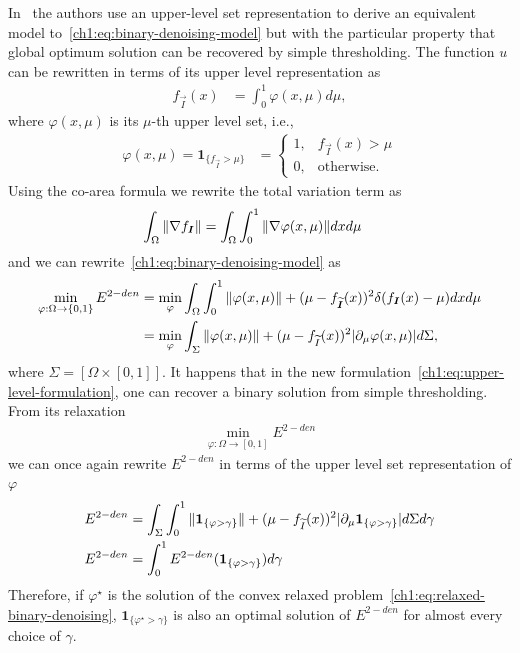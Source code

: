 In~\cite{chan06} the authors use an upper-level set representation to derive an equivalent model to~\cref{ch1:eq:binary-denoising-model} but with the particular property that global  optimum solution can be recovered by simple thresholding. The function $u$ can be rewritten in terms of its upper level representation as
\begin{align*}
	f_{\vec{I}}(x) &= \int_{0}^{1}{\varphi (x,\mu)d\mu},
\end{align*}
%
where $\varphi(x,\mu)$ is its $\mu$-th upper level set, i.e.,
\begin{align*}
\varphi(x,\mu) = \mathbf{1}_{\{f_{\vec{I}} > \mu\}} &= \left\{ \begin{array}{ll}
	1,& f_{\vec{I}}(x) > \mu \\
	0,& \text{otherwise}.
	\end{array}\right.
\end{align*}
%
Using the co-area formula we rewrite the total variation term as
\begin{align*}
	\int_{\Omega}{ \lVert \nabla f_{\bm{I}} \rVert } &= \int_{\Omega}{ \int_{0}^{1}{ \lVert \nabla \varphi (x,\mu) \rVert dxd\mu }}
\end{align*}
%
%
and we can rewrite~\cref{ch1:eq:binary-denoising-model} as
\begin{align}
	\min_{\varphi:\Omega \rightarrow \{0,1\} }E^{2-den} &= \min_{\varphi} \int_{\Omega}{ \int_{0}^{1}{\lVert \varphi(x,\mu)\rVert} } + (\mu -f_{\widetilde{\bm{I}}}(x))^2\delta(f_{\bm{I}}(x)-\mu) dxd\mu \\
	&= \min_{\varphi } \int_{\Sigma}{\lVert \varphi(x,\mu)\rVert + (\mu -f_{\widetilde{I}}(x))^2|\partial_\mu \varphi (x,\mu)|d\Sigma},
	\label{ch1:eq:upper-level-formulation}
\end{align}
%
where $\Sigma = [\Omega \times [0,1]]$. It happens that in the new formulation~\cref{ch1:eq:upper-level-formulation}, one can recover a binary solution from simple thresholding. From its relaxation 
\begin{align}
	\min_{\varphi:\Omega \rightarrow [0,1] }E^{2-den}
	\label{ch1:eq:relaxed-binary-denoising}
\end{align}
%
we can once again rewrite $E^{2-den}$ in terms of the upper level set representation of $\varphi$ 
\begin{align*}
	 E^{2-den} &= \int_{\Sigma}{ \int_{0}^{1}{{\lVert \mathbf{1}_{\{\varphi > \gamma\}}\rVert  + (\mu -f_{\widetilde{I}}(x))^2|\partial_\mu \mathbf{1}_{\{\varphi > \gamma\}}| d\Sigma}d\gamma}} \\
	 E^{2-den} &= \int_{0}^{1}{ E^{2-den}( \mathbf{1}_{\{\varphi > \gamma\}} )d\gamma }
\end{align*}
%
Therefore, if $\varphi^{\star}$ is the solution of the convex relaxed problem~\cref{ch1:eq:relaxed-binary-denoising}, $\mathbf{1}_{\{\varphi^{\star} > \gamma \}}$ is also an optimal solution of $E^{2-den}$ for almost every choice of $\gamma$. 

